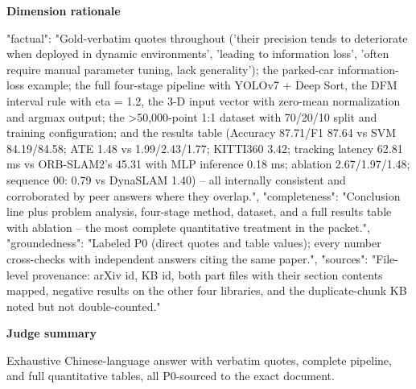 \documentclass[10pt]{article}
\begin{document}
\textbf{Dimension rationale}
\begin{EvidenceText}
{
  "factual": "Gold-verbatim quotes throughout ('their precision tends to deteriorate when deployed in dynamic environments', 'leading to information loss', 'often require manual parameter tuning, lack generality'); the parked-car information-loss example; the full four-stage pipeline with YOLOv7 + Deep Sort, the DFM interval rule with eta = 1.2, the 3-D input vector with zero-mean normalization and argmax output; the >50,000-point 1:1 dataset with 70/20/10 split and training configuration; and the results table (Accuracy 87.71/F1 87.64 vs SVM 84.19/84.58; ATE 1.48 vs 1.99/2.43/1.77; KITTI360 3.42; tracking latency 62.81 ms vs ORB-SLAM2's 45.31 with MLP inference 0.18 ms; ablation 2.67/1.97/1.48; sequence 00: 0.79 vs DynaSLAM 1.40) -- all internally consistent and corroborated by peer answers where they overlap.",
  "completeness": "Conclusion line plus problem analysis, four-stage method, dataset, and a full results table with ablation -- the most complete quantitative treatment in the packet.",
  "groundedness": "Labeled P0 (direct quotes and table values); every number cross-checks with independent answers citing the same paper.",
  "sources": "File-level provenance: arXiv id, KB id, both part files with their section contents mapped, negative results on the other four libraries, and the duplicate-chunk KB noted but not double-counted."
}
\end{EvidenceText}

\textbf{Judge summary}
\begin{EvidenceText}
Exhaustive Chinese-language answer with verbatim quotes, complete pipeline, and full quantitative tables, all P0-sourced to the exact document.
\end{EvidenceText}
\end{document}
